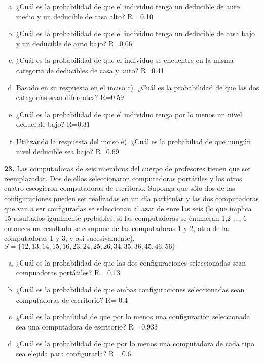 \documentclass[12pt, letterpaper, spanish]{article}
\begin{document}
\begin{enumerate}[a)]
    \item ¿Cuál es la probabilidad de que el individuo tenga un deducible de auto medio y un deducible de casa alto? R= 0.10
    \item ¿Cuál es la probabilidad de que el individuo tenga un deducible de casa bajo y un deducible de auto bajo?  R=0.06
    \item ¿Cuál es la probabilidad de que el individuo se encuentre en la misma categoria de deducibles de casa y auto? R=0.41
    \item Basado en su respuesta en el inciso c). ¿Cuál es la probabilidad de que las dos categorías sean diferentes?   R=0.59
    \item ¿Cuál es la probabilidad de que el individuo tenga por lo menos un nivel deducible bajo?  R=0.31
    \item Utilizando la respuesta del inciso e). ¿Cuál es la probabiliad de que nungún nivel deducible sea bajo?    R=0.69
\end{enumerate}

\textbf{23.} Las computadoras de seis miembros del cuerpo de profesores tienen que ser reemplazadar. Dos de ellos seleccionaron computadoras portátiles y los otros cuatro escogieron computadoras de escritorio. Suponga que sólo dos de las configuraciones pueden ser realizadas en un día particular y las dos computadoras que van a ser configuradas se seleccionan al azar de enre las seis (lo que implica 15 resultados igualmente probables; si las computadoras se enumeran 1,2 ..., 6 entonces un resultado se compone de las computadoras 1 y 2, otro de las computadoras 1 y 3, y así sucesivamente).\\
$S= \{ 12, 13, 14, 15, 16, 23, 24, 25, 26, 34, 35, 36, 45, 46, 56 \}$
\begin{enumerate}[a)]
    \item ¿Cuál es la probabilidad de que las dos configuraciones seleccionadas sean compuadoras portátiles? R= 0.13
    \item ¿Cuál es la probabilidad de que ambas configuraciones seleccionadas sean computadoras de escritorio? R= 0.4
    \item ¿Cuál es la probailidad de que por lo menos una configuración seleccionada sea una computadora de escritorio? R= 0.933
    \item ¿Cuál es la probabilidad de que por lo menos una computadora de cada tipo sea elejida para configurarla? R= 0.6
\end{enumerate}
\end{document}
